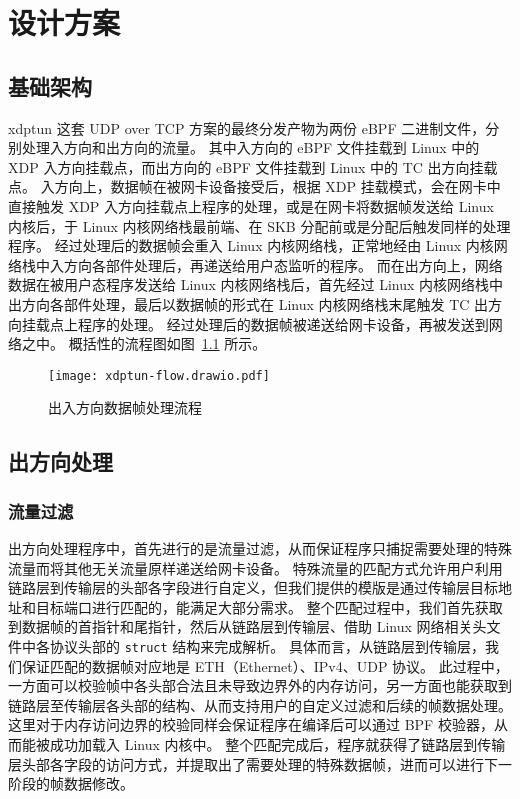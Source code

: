 

\chapter{设计方案}

\section{基础架构}

xdptun 这套 UDP over TCP 方案的最终分发产物为两份 eBPF 二进制文件，分别处理入方向和出方向的流量。
其中入方向的 eBPF 文件挂载到 Linux 中的 XDP 入方向挂载点，而出方向的 eBPF 文件挂载到 Linux 中的 TC 出方向挂载点。
入方向上，数据帧在被网卡设备接受后，根据 XDP 挂载模式，会在网卡中直接触发 XDP 入方向挂载点上程序的处理，或是在网卡将数据帧发送给 Linux 内核后，于 Linux 内核网络栈最前端、在 SKB 分配前或是分配后触发同样的处理程序。
经过处理后的数据帧会重入 Linux 内核网络栈，正常地经由 Linux 内核网络栈中入方向各部件处理后，再递送给用户态监听的程序。
而在出方向上，网络数据在被用户态程序发送给 Linux 内核网络栈后，首先经过 Linux 内核网络栈中出方向各部件处理，最后以数据帧的形式在 Linux 内核网络栈末尾触发 TC 出方向挂载点上程序的处理。
经过处理后的数据帧被递送给网卡设备，再被发送到网络之中。
概括性的流程图如图~\ref{fig:flow} 所示。

\begin{figure}[h]
  \centering
  \texttt{[image: xdptun-flow.drawio.pdf]}
  \caption{出入方向数据帧处理流程}
  \label{fig:flow}
\end{figure}

\section{出方向处理}

\subsection{流量过滤}

出方向处理程序中，首先进行的是流量过滤，从而保证程序只捕捉需要处理的特殊流量而将其他无关流量原样递送给网卡设备。
特殊流量的匹配方式允许用户利用链路层到传输层的头部各字段进行自定义，但我们提供的模版是通过传输层目标地址和目标端口进行匹配的，能满足大部分需求。
整个匹配过程中，我们首先获取到数据帧的首指针和尾指针，然后从链路层到传输层、借助 Linux 网络相关头文件中各协议头部的 \texttt{struct} 结构来完成解析。
具体而言，从链路层到传输层，我们保证匹配的数据帧对应地是 ETH（Ethernet）、IPv4、UDP 协议。
此过程中，一方面可以校验帧中各头部合法且未导致边界外的内存访问，另一方面也能获取到链路层至传输层各头部的结构、从而支持用户的自定义过滤和后续的帧数据处理。
这里对于内存访问边界的校验同样会保证程序在编译后可以通过 BPF 校验器，从而能被成功加载入 Linux 内核中。
整个匹配完成后，程序就获得了链路层到传输层头部各字段的访问方式，并提取出了需要处理的特殊数据帧，进而可以进行下一阶段的帧数据修改。

